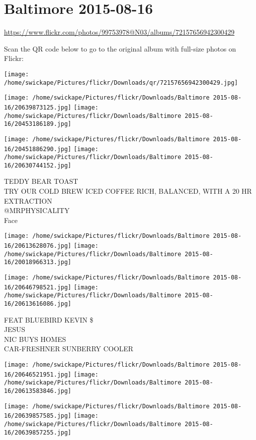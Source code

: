 \documentclass[10pt,letterpaper]{article}
\title{}
\author{}
\date{}
\begin{document}
\section*{Baltimore 2015-08-16}

\url{https://www.flickr.com/photos/99753978@N03/albums/72157656942300429}

Scan the QR code below to go to the original album with full-size photos on Flickr:

\texttt{[image: /home/swickape/Pictures/flickr/Downloads/qr/72157656942300429.jpg]}
\pagebreak

\texttt{[image: /home/swickape/Pictures/flickr/Downloads/Baltimore 2015-08-16/20639873125.jpg]}
\texttt{[image: /home/swickape/Pictures/flickr/Downloads/Baltimore 2015-08-16/20453186189.jpg]}

\texttt{[image: /home/swickape/Pictures/flickr/Downloads/Baltimore 2015-08-16/20451886290.jpg]}
\texttt{[image: /home/swickape/Pictures/flickr/Downloads/Baltimore 2015-08-16/20630744152.jpg]}

TEDDY BEAR TOAST\\
TRY OUR COLD BREW ICED COFFEE RICH, BALANCED, WITH A 20 HR EXTRACTION\\
@MRPHYSICALITY\\
Face
\pagebreak

\texttt{[image: /home/swickape/Pictures/flickr/Downloads/Baltimore 2015-08-16/20613628076.jpg]}
\texttt{[image: /home/swickape/Pictures/flickr/Downloads/Baltimore 2015-08-16/20018966313.jpg]}

\texttt{[image: /home/swickape/Pictures/flickr/Downloads/Baltimore 2015-08-16/20646798521.jpg]}
\texttt{[image: /home/swickape/Pictures/flickr/Downloads/Baltimore 2015-08-16/20613616086.jpg]}

FEAT BLUEBIRD KEVIN \$\\
JESUS\\
NIC BUYS HOMES\\
CAR{-}FRESHNER SUNBERRY COOLER
\pagebreak

\texttt{[image: /home/swickape/Pictures/flickr/Downloads/Baltimore 2015-08-16/20646521951.jpg]}
\texttt{[image: /home/swickape/Pictures/flickr/Downloads/Baltimore 2015-08-16/20613583846.jpg]}

\texttt{[image: /home/swickape/Pictures/flickr/Downloads/Baltimore 2015-08-16/20639857585.jpg]}
\texttt{[image: /home/swickape/Pictures/flickr/Downloads/Baltimore 2015-08-16/20639857255.jpg]}
\end{document}
